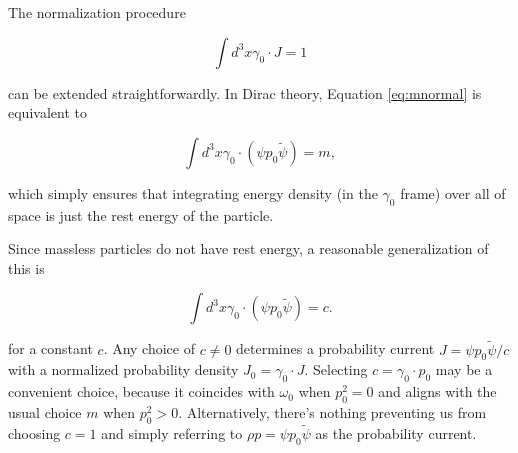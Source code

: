 \documentclass[twocolumn]{article}
\begin{document}
  The normalization procedure

  \begin{equation}
    \int d^3x \gamma_0 \cdot J = 1\label{eq:mnormal}
  \end{equation}

  can be extended straightforwardly. In Dirac theory, Equation \ref{eq:mnormal} is equivalent to

  \begin{equation}
    \int d^3x \gamma_0 \cdot (\psi p_0 \widetilde \psi) = m,
  \end{equation}

  which simply ensures that integrating energy density (in the $\gamma_0$ frame) over all of space is just the rest energy of the particle.

  Since massless particles do not have rest energy, a reasonable generalization of this is

  \begin{equation}
    \int d^3x \gamma_0 \cdot (\psi p_0 \widetilde \psi) = c. \label{eq:normalization}
  \end{equation}

  for a constant $c$. Any choice of $c \not= 0$ determines a probability current $J = \psi p_0 \widetilde \psi / c$ with a normalized probability density $J_0 = \gamma_0 \cdot J$. Selecting $c = \gamma_0 \cdot p_0$ may be a convenient choice, because it coincides with $\omega_0$ when $p_0^2 = 0$ and aligns with the usual choice $m$ when $p_0^2 > 0$. Alternatively, there's nothing preventing us from choosing $c = 1$ and simply referring to $\rho p = \psi p_0 \widetilde \psi$ as the probability current.




\end{document}
